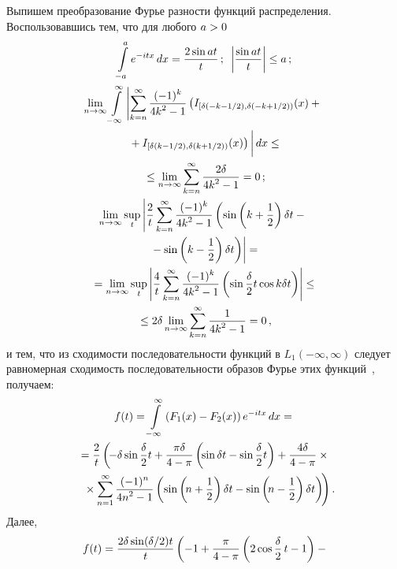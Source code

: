 \begin{multicols}{2}
Выпишем преобразование Фурье разности функций распределения.
Воспользовавшись тем, что для любого $a\hm>0$
\begin{gather*}
\int\limits_{-a}^{a}  e^{-i t x}\,dx = \fr{2\sin a t}{t}\,; \enskip
\left|\fr{ \sin a t}{t}\right|\le a\,;
\\
\lim\limits_{n \to \infty}\int\limits_{-\infty}^{\infty}
\left|
\sum\limits_{k=n}^{\infty} \fr{(-1)^k}{4k^2 - 1 }
\left( I_{[\delta(-k-{1}/{2}),\delta(-k+{1}/{2}))}(x) +{}\right.\right.\\
\left.\left.{}+I_{[\delta(k-1/2),\delta(k+{1}/{2})) }(x)
\right) \vphantom{\fr{(-1)^k}{k^2}}
\right|dx
\le{}\\
{}\le
 \lim\limits_{n \to \infty} \sum\limits_{k=n}^{\infty} \fr{2\delta}{4k^2 - 1 }  =  0 \,;
\\
\lim\limits_{n \to \infty}\sup\limits_t
\left|\fr{2}{t}\sum\limits_{k=n}^{\infty} \fr{(-1)^k}{4k^2 - 1 }
\left(\sin\left(k+\fr{1}{2}\right)\delta t  -{}\right.\right.\\
\left.\left.{}- \sin\left(k - \fr{1}{2}\right)\delta t\right)
\right|  = {}
\\
{}=\lim\limits_{n \to \infty}\sup\limits_t
\left|\fr{4}{t}\sum\limits_{k=n}^{\infty} \fr{(-1)^k}{4k^2 - 1 }
\left(\sin \fr{\delta}{2}  t  \cos k \delta t\right)
\right| \le{}\\
{}\le
2\delta
\lim\limits_{n \to \infty} \sum\limits_{k=n}^{\infty} \fr{ 1 }{4k^2 - 1 }
    =  0\,,
\end{gather*}
и тем, что из сходимости последовательности функций в
$L_1(-\infty,\infty)$ следует равномерная сходимость
последовательности образов Фурье этих функций~\cite{KolmFomin}, получаем:
\begin{multline*}
f(t) = \int\limits_{-\infty}^{\infty}
\left(F_1(x) - F_2(x)\right) e^{-i t x}\,dx ={}
\\
{}= \fr{2}{t}\left(\!
-\delta\sin \fr{\delta}{2} t +
\fr{\pi \delta }{4-\pi}\left(\!\sin \delta t - \sin \fr{\delta}{2}t\right)+
\fr{4 \delta }{4-\pi} \times{} \right.\\
\!\left.{}\times
\sum\limits_{n=1}^{\infty} \fr{(-1)^n}{4n^2 - 1 }
\left(\sin\left(\!n+\fr{1}{2}\right)\delta t  - \sin\left(\!n - \fr{1}{2}\right)\delta t\right)\!
\right).\hspace*{-8.84514pt}
\end{multline*}
Далее,
\begin{multline*}
f(t)  = \fr{2\delta \sin ({\delta}/{2}) t}{t}\left(- 1
 +
\fr{\pi  }{4-\pi}
\left(2 \cos \fr{\delta}{2} \,t - 1\right) -{}\right.\hspace*{-3.037pt}\\

\end{multline*}
\end{multicols}
